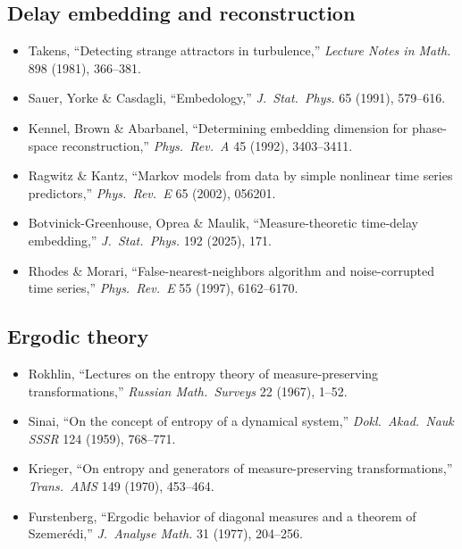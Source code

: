 \subsection*{Delay embedding and reconstruction}
\begin{itemize}
  \item Takens, ``Detecting strange attractors in turbulence,'' \emph{Lecture Notes in Math.} 898 (1981), 366--381.~\cite{Takens1981}
  \item Sauer, Yorke \& Casdagli, ``Embedology,'' \emph{J.\ Stat.\ Phys.} 65 (1991), 579--616.~\cite{SauerYorkeCasdagli1991}
  \item Kennel, Brown \& Abarbanel, ``Determining embedding dimension for phase-space reconstruction,'' \emph{Phys.\ Rev.\ A} 45 (1992), 3403--3411.~\cite{KennelBrownAbarbanel1992}
  \item Ragwitz \& Kantz, ``Markov models from data by simple nonlinear time series predictors,'' \emph{Phys.\ Rev.\ E} 65 (2002), 056201.~\cite{RagwitzKantz2002}
  \item Botvinick-Greenhouse, Oprea \& Maulik, ``Measure-theoretic time-delay embedding,'' \emph{J.\ Stat.\ Phys.} 192 (2025), 171.~\cite{BotvinickGreenhouse2025}
  \item Rhodes \& Morari, ``False-nearest-neighbors algorithm and noise-corrupted time series,'' \emph{Phys.\ Rev.\ E} 55 (1997), 6162--6170.~\cite{RhodesMorari1997}
\end{itemize}

\subsection*{Ergodic theory}
\begin{itemize}
  \item Rokhlin, ``Lectures on the entropy theory of measure-preserving transformations,'' \emph{Russian Math.\ Surveys} 22 (1967), 1--52.~\cite{Rokhlin1967}
  \item Sinai, ``On the concept of entropy of a dynamical system,'' \emph{Dokl.\ Akad.\ Nauk SSSR} 124 (1959), 768--771.~\cite{Sinai1959}
  \item Krieger, ``On entropy and generators of measure-preserving transformations,'' \emph{Trans.\ AMS} 149 (1970), 453--464.~\cite{Krieger1970}
  \item Furstenberg, ``Ergodic behavior of diagonal measures and a theorem of Szemer\'{e}di,'' \emph{J.\ Analyse Math.} 31 (1977), 204--256.~\cite{Furstenberg1977}
\end{itemize}

